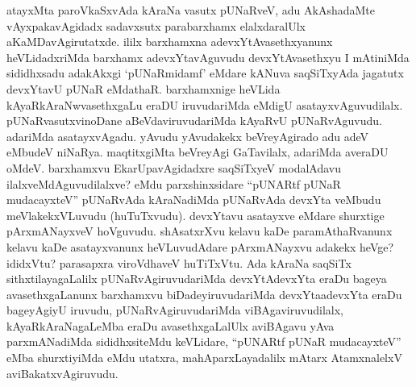 \begin{artha}
atayxMta paroVkaSxvAda kAraNa vasutx pUNaRveV, adu AkAshadaMte vAyxpakavAgidadx sadavxsutx parabarxhamx elalxdaralUlx aKaMDavAgirutatxde. ililx barxhamxna adevxYtAvasethxyanunx heVLidadxriMda barxhamx adevxYtavAguvudu devxYtAvasethxyu I mAtiniMda sididhxsadu adakAkxgi `pUNaRmidamf' eMdare kANuva saqSiTxyAda jagatutx devxYtavU pUNaR eMdathaR. barxhamxnige heVLida kAyaRkAraNwvasethxgaLu eraDU iruvudariMda eMdigU asatayxvAguvudilalx. pUNaRvasutxvinoDane aBeVdaviruvudariMda kAyaRvU pUNaRvAguvudu. adariMda asatayxvAgadu. yAvudu yAvudakekx beVreyAgirado adu adeV eMbudeV niNaRya. maqtitxgiMta beVreyAgi GaTavilalx, adariMda averaDU oMdeV. barxhamxvu EkarUpavAgidadxre saqSiTxyeV modalAdavu ilalxveMdAguvudilalxve? eMdu parxshinxsidare ``pUNARtf pUNaR mudacayxteV'' pUNaRvAda kAraNadiMda pUNaRvAda devxYta veMbudu meVlakekxVLuvudu (huTuTxvudu). devxYtavu asatayxve eMdare shurxtige pArxmANayxveV hoVguvudu. shAsatxrXvu kelavu kaDe paramAthaRvanunx kelavu kaDe asatayxvanunx heVLuvudAdare pArxmANayxvu adakekx heVge? ididxVtu? parasapxra viroVdhaveV huTiTxVtu. Ada kAraNa saqSiTx sithxtilayagaLalilx pUNaRvAgiruvudariMda devxYtAdevxYta eraDu bageya avasethxgaLanunx barxhamxvu biDadeyiruvudariMda devxYtaadevxYta eraDu bageyAgiyU iruvudu, pUNaRvAgiruvudariMda viBAgaviruvudilalx, kAyaRkAraNagaLeMba eraDu avasethxgaLalUlx aviBAgavu yAva parxmANadiMda sididhxsiteMdu keVLidare, ``pUNARtf pUNaR mudacayxteV'' eMba shurxtiyiMda eMdu utatxra, mahAparxLayadalilx mAtarx AtamxnalelxV aviBakatxvAgiruvudu.
\end{artha}

